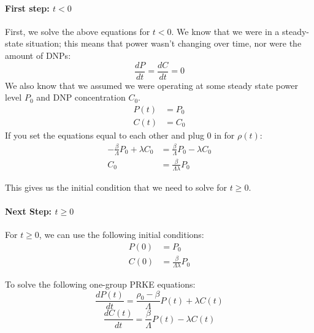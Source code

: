\documentclass[letter]{article}
\begin{document}
\paragraph{First step: $t < 0$}
First, we solve the above equations for $t < 0$. We know that we were in a
steady-state situation; this means that power wasn't changing over
time, nor were the amount of DNPs:
\begin{equation*}
  \frac{dP}{dt}=\frac{dC}{dt}=0
\end{equation*}
We also know that we assumed we were operating at some steady state
power level $P_0$ and DNP concentration $C_0$.
\begin{equation*}
  \begin{split}
    P(t) &= P_0 \\
    C(t) &= C_0
  \end{split}
\end{equation*}
If you set the equations equal to each other and plug $0$ in for
$\rho(t)$:
\begin{equation*}
  \begin{split}
    -\frac{\beta}{\Lambda}P_0+\lambda{}C_0 &=
    \frac{\beta}{\Lambda}P_0-\lambda{}C_0 \\
    C_0 &= \frac{\beta}{\Lambda\lambda}P_0
  \end{split}
\end{equation*}

This gives us the initial condition that we need to solve for $t\geq 0$.

\paragraph{Next Step: $t \geq 0$}

For $t \geq 0$, we can use the following initial conditions:
\begin{equation*}
  \begin{split}
    P(0) &= P_0 \\
    C(0) &= \frac{\beta}{\Lambda\lambda}P_0
  \end{split}
\end{equation*}

To solve the following one-group PRKE equations:
\begin{equation*}
      \frac{dP(t)}{dt}= \frac{\rho_0-\beta}{\Lambda}P(t)+\lambda{}C(t)
\end{equation*}
\begin{equation*}
    \frac{dC(t)}{dt}=\frac{\beta}{\Lambda}P(t)-\lambda{}C(t)
\end{equation*}
\end{document}

